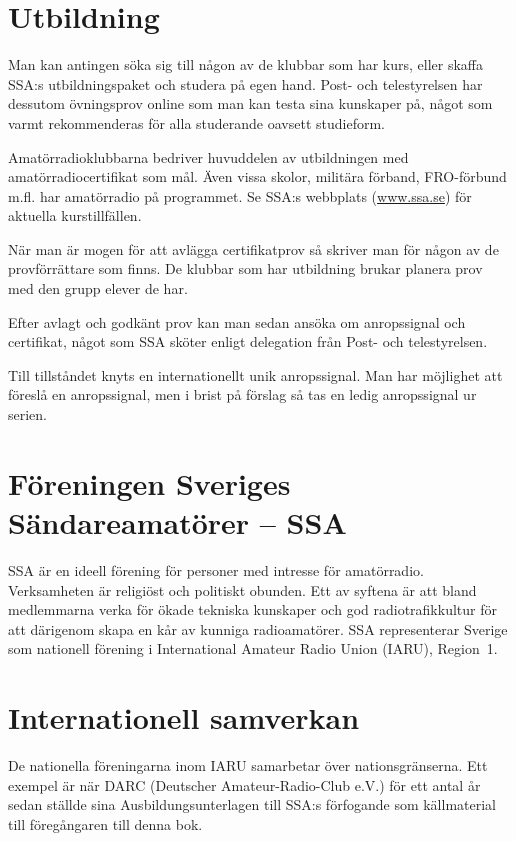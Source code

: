 \section*{Utbildning}

Man kan antingen söka sig till någon av de klubbar som har kurs, eller skaffa
SSA:s utbildningspaket och studera på egen hand.
Post- och telestyrelsen har dessutom övningsprov online som man kan testa sina
kunskaper på, något som varmt rekommenderas för alla studerande oavsett
studieform.

Amatörradioklubbarna bedriver huvuddelen av utbildningen med
amatör\-radio\-certi\-fikat som mål.
Även vissa skolor, militära förband, FRO-förbund m.fl. har amatörradio på
programmet.
Se SSA:s webbplats (\href{http://www.ssa.se}{www.ssa.se}) för aktuella kurstillfällen.

När man är mogen för att avlägga certifikatprov så skriver man för någon av de
provförrättare som finns. De klubbar som har utbildning brukar planera prov
med den grupp elever de har.

Efter avlagt och godkänt prov kan man sedan ansöka om anropssignal och
certifikat, något som SSA sköter enligt delegation från Post- och telestyrelsen.

Till tillståndet knyts en internationellt unik anropssignal.
Man har möjlighet att föreslå en anropssignal, men i brist på förslag så tas en ledig
anropssignal ur serien.

\section*{Föreningen Sveriges Sändareamatörer -- SSA}

SSA är en ideell förening för personer med intresse för amatörradio.
Verksamheten är religiöst och politiskt obunden.
Ett av syftena är att bland medlemmarna verka för ökade tekniska kunskaper och
god radiotrafikkultur för att därigenom skapa en kår av kunniga radioamatörer.
SSA representerar Sverige som nationell förening i
International Amateur Radio Union (IARU), Region~1.

\section*{Internationell samverkan}

De nationella föreningarna inom IARU samarbetar över nationsgränserna.
Ett exempel är när DARC (Deutscher Amateur-Radio-Club e.V.) för ett antal år
sedan ställde sina Ausbildungsunterlagen \cite{DARCaus} till SSA:s förfogande
som källmaterial till föregångaren till denna bok.

